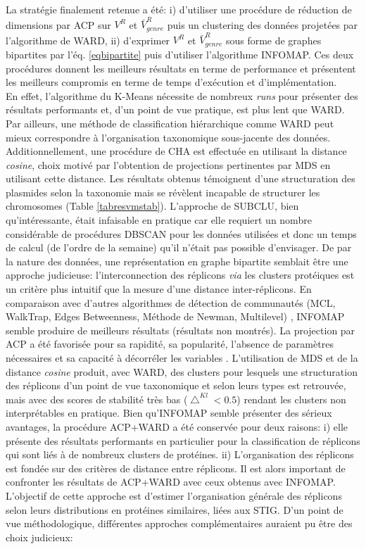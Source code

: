 La stratégie finalement retenue a été: i) d'utiliser une procédure de réduction de dimensions par ACP sur $V^{R}$ et $\bar{V}^{R}_{genre}$ puis un clustering des données projetées par l'algorithme de WARD, ii) d'exprimer $V^{R}$ et $\bar{V}^{R}_{genre}$ sous forme de graphes bipartites par l'éq. \ref{eqbipartite} puis d'utiliser l'algorithme INFOMAP. Ces deux procédures donnent les meilleurs résultats en terme de performance et présentent les meilleurs compromis en terme de temps d'exécution et d'implémentation. \\
En effet, l'algorithme du K-Means nécessite de nombreux \textit{runs} pour présenter des résultats performants et, d'un point de vue pratique, est plus lent que WARD. Par ailleurs, une méthode de classification hiérarchique comme WARD peut mieux correspondre à l'organisation taxonomique sous-jacente des données. 
Additionnellement, une procédure de CHA est effectuée en utilisant la distance \textit{cosine}, choix motivé par l'obtention de projections pertinentes par MDS en utilisant cette distance. Les résultats obtenus témoignent d'une structuration des plasmides selon la taxonomie mais se révèlent incapable de structurer les chromosomes (Table \ref{tabresvmstab}). 
L'approche de SUBCLU, bien qu'intéressante, était infaisable en pratique car elle requiert un nombre considérable de procédures DBSCAN pour les données utilisées et donc un temps de calcul (de l'ordre de la semaine) qu'il n'était pas possible d'envisager.
De par la nature des données, une représentation en graphe bipartite semblait être une approche judicieuse: l'interconnection des réplicons \textit{via} les clusters protéiques est un critère plus intuitif que la mesure d'une distance inter-réplicons. En comparaison avec d'autres algorithmes de détection de communautés (MCL, WalkTrap, Edges Betweenness, Méthode de Newman, Multilevel) \citep{Coscia2011}, INFOMAP semble produire de meilleurs résultats (résultats non montrés).
La projection par ACP a été favorisée pour sa rapidité, sa popularité, l'absence de paramètres nécessaires et sa capacité à décorréler les variables \citep{duby2006analyse}. L'utilisation de MDS et de la distance \textit{cosine} produit, avec WARD, des clusters pour lesquels une structuration des réplicons d'un point de vue taxonomique et selon leurs types est retrouvée, mais avec des scores de stabilité très bas ($\bigtriangleup^{Kl}<0.5$) rendant les clusters non interprétables en pratique.
Bien qu'INFOMAP semble présenter des sérieux avantages, la procédure ACP+WARD a été conservée pour deux raisons: i) elle présente des résultats performants en particulier pour la classification de réplicons qui sont liés à de nombreux clusters de protéines. ii) L'organisation des réplicons est fondée sur des critères de distance entre réplicons. Il est alors important de confronter les résultats de ACP+WARD avec ceux obtenus avec INFOMAP. \\
 L'objectif de cette approche est d'estimer l'organisation générale des réplicons selon leurs distributions en protéines similaires, liées aux STIG. D'un point de vue méthodologique, différentes approches complémentaires auraient pu être des choix judicieux:
 
